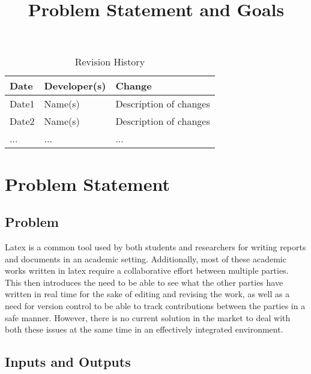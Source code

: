 \documentclass{article}
\title{Problem Statement and Goals\\\progname}
\author{\authname}
\date{}
\begin{document}
\maketitle

\begin{table}[hp]
\caption{Revision History} \label{TblRevisionHistory}
\begin{tabularx}{\textwidth}{llX}
\toprule
\textbf{Date} & \textbf{Developer(s)} & \textbf{Change}\\
\midrule
Date1 & Name(s) & Description of changes\\
Date2 & Name(s) & Description of changes\\
... & ... & ...\\
\bottomrule
\end{tabularx}
\end{table}

\section{Problem Statement}


\subsection{Problem}

Latex is a common tool used by both students and researchers for writing reports and documents in an academic setting. Additionally, most of these academic works written in latex require a collaborative effort between multiple parties.
This then introduces the need to be able to see what the other parties have written in real time for the sake of editing and revising the work, as well as a need for version control to be able to track contributions between the parties 
in a safe manner. However, there is no current solution in the market to deal with both these issues at the same time in an effectively integrated environment.

\subsection{Inputs and Outputs}

\end{document}
